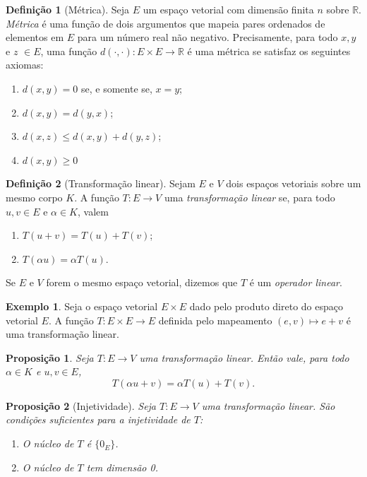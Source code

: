 \documentclass[a4paper,12pt]{report}
\theoremstyle{plain}
\newtheorem{proposicao}{Proposição}[section]
\theoremstyle{definition}
\newtheorem{definicao}{Definição}[section]
\newtheorem{exemplo}{Exemplo}[section]
\begin{document}
	\begin{definicao}[Métrica]
		Seja $E$ um espaço vetorial com dimensão finita $n$ sobre $\mathbb{R}$. \textit{Métrica} é uma função de dois argumentos que mapeia pares ordenados de elementos em $E$ para um número real não negativo. Precisamente, para todo $x, y$ e $z$ $\in E$, uma função $d(\cdot,\cdot): E \times E \longrightarrow \mathbb{R}$ é uma métrica se satisfaz os seguintes axiomas:
		\begin{enumerate}
			\item $d(x,y) = 0$ se, e somente se, $x = y$; 
			\item $d(x,y) = d(y,x)$;
			\item $d(x,z) \leq d(x,y) + d(y,z)$;
			\item $d(x,y) \geq 0$
		\end{enumerate}
	\end{definicao}
	
	\begin{definicao}[Transformação linear]
		Sejam $E$ e $V$ dois espaços vetoriais sobre um mesmo corpo $K$. A função $T : E\longrightarrow V$ uma \emph{transformação linear} se, para todo $u,v\in E$ e $\alpha\in K$, valem
		\begin{enumerate}
			\item $T(u+v) = T(u) + T(v)$;
			\item $T(\alpha u) = \alpha T(u)$.
		\end{enumerate}
		Se $E$ e $V$ forem o mesmo espaço vetorial, dizemos que $T$ é um \emph{operador linear}.
	\end{definicao}
	
	\begin{exemplo}
		Seja o espaço vetorial $E\times E$ dado pelo produto direto do espaço vetorial $E$. A função $T: E\times E \longrightarrow E$ definida pelo mapeamento $(e,v) \mapsto e+v$ é uma transformação linear.
	\end{exemplo}

	\begin{proposicao}
		Seja $T:E\longrightarrow V$ uma transformação linear. Então vale, para todo $\alpha\in K$ e $u,v \in E$,$$T(\alpha u + v) = \alpha T(u)+T(v).$$
	\end{proposicao}

	\begin{proposicao}[Injetividade]
		Seja $T:E\longrightarrow V$ uma transformação linear. São condições suficientes para a injetividade de $T$:
		 \begin{enumerate}
		 	\item O núcleo de $T$ é $\{0_E\}$.
		 	\item O núcleo de $T$ tem dimensão 0.
		 \end{enumerate}
	\end{proposicao}
	
\end{document}

